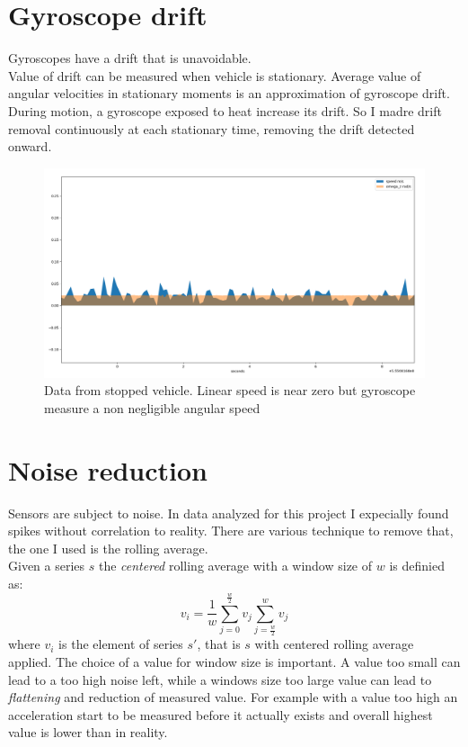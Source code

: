 \section{Gyroscope drift}
Gyroscopes have a drift that is unavoidable. \cite{6727722} \\
Value of drift can be measured when vehicle is stationary. Average value of angular velocities in stationary moments is an approximation of gyroscope drift.
During motion, a gyroscope exposed to heat increase its drift. So I madre drift removal continuously at each stationary time, removing the drift detected onward. 
\begin{figure}[H]
\includegraphics[width=\textwidth]{gyro_drift.png}
\caption{Data from stopped vehicle. Linear speed is near zero but gyroscope measure a non negligible angular speed}
\end{figure}

\section{Noise reduction}
Sensors are subject to noise. In data analyzed for this project I expecially found spikes without correlation to reality.
There are various technique to remove that, the one I used is the rolling average. \\
Given a series $s$ the \textit{centered} rolling average with a window size of $w$ is definied as:
$$ v_i = \frac{1}{w} \sum_{j=0}^{\frac{w}{2}}v_j \sum_{j=\frac{w}{2}}^{w}v_j $$
where $v_i$ is the element of series $s'$, that is $s$ with centered rolling average applied.
The choice of a value for window size is important. A value too small can lead to a too high noise left, while a windows size too large value can lead to \textit{flattening} and reduction of measured value. For example with a value too high an acceleration start to be measured before it actually exists and overall highest value is lower than in reality.

